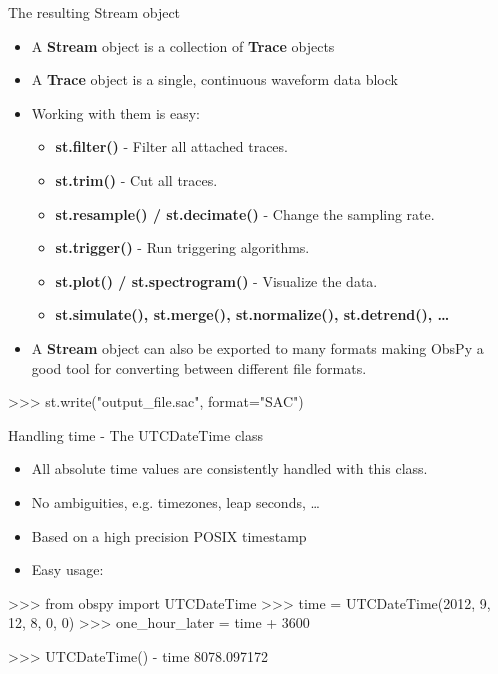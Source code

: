 \documentclass[handout]{beamer}
\begin{document}
\begin{frame}{The resulting Stream object}
 \begin{itemize}
     \item A \textbf{Stream} object is a collection of \textbf{Trace} objects
     \item A \textbf{Trace} object is a single, continuous waveform data block
     \item Working with them is easy:
         \begin{itemize}
             \item \textbf{st.filter()} - Filter all attached traces.
             \item \textbf{st.trim()} - Cut all traces.
             \item \textbf{st.resample() / st.decimate()} - Change the sampling rate.
             \item \textbf{st.trigger()} - Run triggering algorithms.
             \item \textbf{st.plot() / st.spectrogram()} - Visualize the data.
             \item \textbf{st.simulate(), st.merge(), st.normalize(), st.detrend(), \dots}
         \end{itemize}
     \item A \textbf{Stream} object can also be exported to many formats making ObsPy a good tool for converting between different file formats.
\end{itemize}
\begin{myColorBox}{0.95}{}
\begin{python}
>>> st.write("output_file.sac", format="SAC")
\end{python}
\end{myColorBox}

\end{frame}


\begin{frame}{Handling time - The UTCDateTime class}
    \begin{itemize}
        \item All absolute time values are consistently handled with this class.
        \item No ambiguities, e.g. timezones, leap seconds, \dots
        \item Based on a high precision POSIX timestamp
        \item Easy usage:
\end{itemize}
\begin{myColorBox}{0.95}{}
\begin{python}
>>> from obspy import UTCDateTime
>>> time = UTCDateTime(2012, 9, 12, 8, 0, 0)
>>> one_hour_later = time + 3600

>>> UTCDateTime() - time
8078.097172
\end{python}
\end{myColorBox}

\end{frame}
\end{document}
